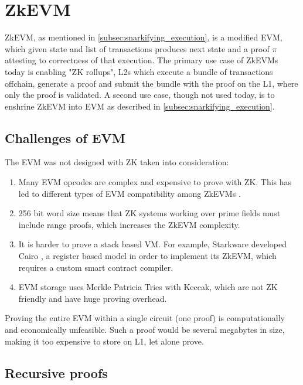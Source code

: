 \section{ZkEVM}\label{sec:zkevm}

ZkEVM, as mentioned in \ref{subsec:snarkifying_execution}, is a modified EVM,
which given state and list of transactions produces next state and a proof $\pi$
attesting to correctness of that execution. The primary use case of ZkEVMs today is
enabling "ZK rollups", L2s which execute a bundle of transactions offchain,
generate a proof and submit the bundle with the proof on the L1, where only the
proof is validated. A second use case, though not used today, is to enshrine ZkEVM
into EVM as described in \ref{subsec:snarkifying_execution}.

\subsection{Challenges of EVM}

The EVM was not designed with ZK taken into consideration:

\begin{enumerate}
	\item Many EVM opcodes are complex and expensive to prove with ZK. This has
	      led to different types of EVM compatibility among ZkEVMs \cite{VitalikButerinZkEVMTypes}.
	\item 256 bit word size means that ZK systems working over prime fields must
	      include range proofs, which increases the ZkEVM complexity.
	\item It is harder to prove a stack based VM. For example, Starkware developed
	      Cairo \cite{Cairo}, a register based model in order to implement its ZkEVM,
	      which requires a custom smart contract compiler.
	\item EVM storage uses Merkle Patricia Tries with Keccak, which are not
	      ZK friendly and have huge proving overhead.
\end{enumerate}

Proving the entire EVM within a single circuit (one proof) is computationally
and economically unfeasible. Such a proof would be several megabytes in size,
making it too expensive to store on L1, let alone prove.

\subsection{Recursive proofs}

